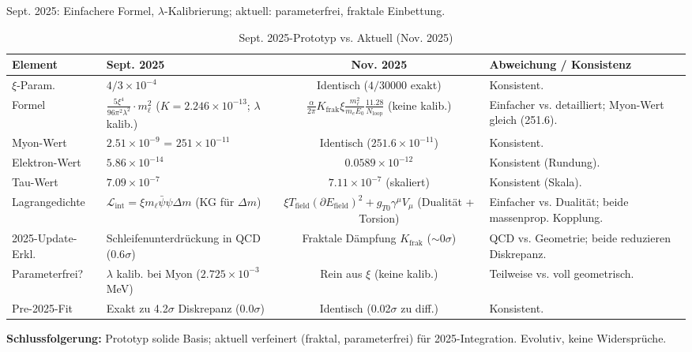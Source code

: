 \documentclass[12pt,a4paper]{article}
\begin{document}
	Sept. 2025: Einfachere Formel, $\lambda$-Kalibrierung; aktuell: parameterfrei, fraktale Einbettung.
	
	\begin{table}[ht!]
		\centering
		\small
		\begin{adjustbox}{max width=\textwidth}
			\begin{tabular}{llcl}
				\toprule
				Element & Sept. 2025 & Nov. 2025 & Abweichung / Konsistenz \\
				\midrule
				$\xi$-Param. & $4/3 \times 10^{-4}$ & Identisch ($4/30000$ exakt) & Konsistent. \\
				Formel & $\frac{5\xi^4}{96\pi^2 \lambda^2} \cdot m_\ell^2$ ($K=2.246\times10^{-13}$; $\lambda$ kalib.) & $\frac{\alpha}{2\pi} K_\text{frak} \xi \frac{m_\ell^2}{m_e E_0} \frac{11.28}{N_\text{loop}}$ (keine kalib.) & Einfacher vs. detailliert; Myon-Wert gleich (251.6). \\
				Myon-Wert & $2.51 \times 10^{-9}$ = $251 \times 10^{-11}$ & Identisch ($251.6 \times 10^{-11}$) & Konsistent. \\
				Elektron-Wert & $5.86 \times 10^{-14}$ & $0.0589 \times 10^{-12}$ & Konsistent (Rundung). \\
				Tau-Wert & $7.09 \times 10^{-7}$ & $7.11 \times 10^{-7}$ (skaliert) & Konsistent (Skala). \\
				Lagrangedichte & $\mathcal{L}_\text{int} = \xi m_\ell \bar{\psi} \psi \Delta m$ (KG für $\Delta m$) & $\xi T_\text{field} (\partial E_\text{field})^2 + g_{T0} \gamma^\mu V_\mu$ (Dualität + Torsion) & Einfacher vs. Dualität; beide massenprop. Kopplung. \\
				2025-Update-Erkl. & Schleifenunterdrückung in QCD (0.6$\sigma$) & Fraktale Dämpfung $K_\text{frak}$ ($\sim 0\sigma$) & QCD vs. Geometrie; beide reduzieren Diskrepanz. \\
				Parameterfrei? & $\lambda$ kalib. bei Myon ($2.725 \times 10^{-3}$ MeV) & Rein aus $\xi$ (keine kalib.) & Teilweise vs. voll geometrisch. \\
				Pre-2025-Fit & Exakt zu 4.2$\sigma$ Diskrepanz (0.0$\sigma$) & Identisch (0.02$\sigma$ zu diff.) & Konsistent. \\
				\bottomrule
			\end{tabular}
		\end{adjustbox}
		\caption{Sept. 2025-Prototyp vs. Aktuell (Nov. 2025)}
		\label{tab:prototype_comparison}
	\end{table}
	
	\textbf{Schlussfolgerung:} Prototyp solide Basis; aktuell verfeinert (fraktal, parameterfrei) für 2025-Integration. Evolutiv, keine Widersprüche.
	
\end{document}
